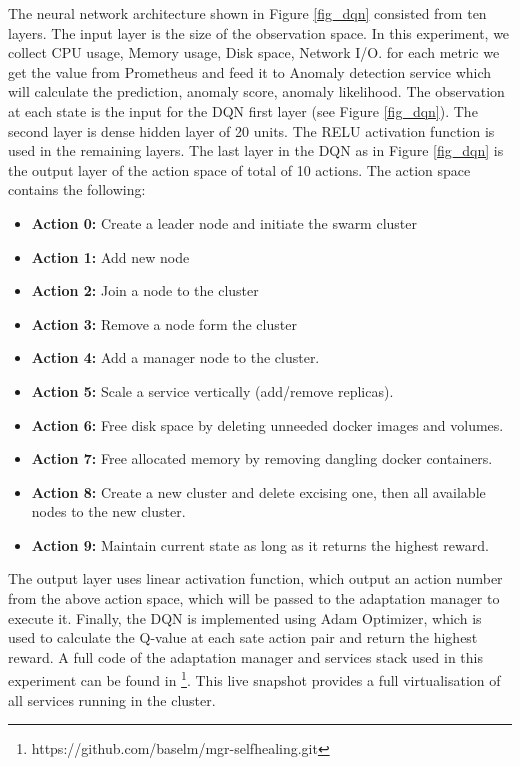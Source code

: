 \documentclass{ieeeaccess}
\begin{document}
The neural network architecture shown in Figure \ref{fig_dqn} consisted from ten layers. The input layer is the size of the observation space. In this experiment, we collect CPU usage, Memory usage, Disk space, Network I/O.  for each metric we get the value from Prometheus and feed it to Anomaly detection service which will calculate the prediction, anomaly score, anomaly likelihood. The observation at each state is the input for the DQN first layer (see Figure \ref{fig_dqn}).
The second layer is dense hidden layer of 20 units. The RELU activation function is used in the remaining layers. The last layer in the DQN as in Figure \ref{fig_dqn} is the output layer of the action space of total of 10 actions. The action space contains the following:
\begin{itemize}


\item \textbf{Action 0:} Create a leader node and initiate the swarm cluster
\item \textbf{Action 1:} Add new node 
\item \textbf{Action 2:} Join a node to the cluster 
\item \textbf{Action 3:} Remove a node form the cluster 
\item \textbf{Action 4:} Add a manager node to the cluster.
\item \textbf{Action 5:} Scale a service vertically (add/remove replicas).
\item \textbf{Action 6:} Free disk space by deleting unneeded docker images and volumes.
\item \textbf{Action 7:} Free allocated memory by removing dangling docker containers.
\item  \textbf{Action 8:} Create a new cluster and delete excising one, then all available nodes to the new cluster.
\item  \textbf{Action 9:} Maintain current state as long as it returns the highest reward.
\end{itemize}

The output layer uses linear activation function, which output an action number from the above action space, which will be passed to the adaptation manager to execute it. Finally, the DQN is implemented using Adam Optimizer, which is used to calculate the Q-value at each sate action pair and return the highest reward. A full code of the adaptation manager and services stack used in this experiment can be found in \footnote{https://github.com/baselm/mgr-selfhealing.git}. This live snapshot \cite{snapshot3} provides a full virtualisation of all services running in the cluster.  
\end{document}
